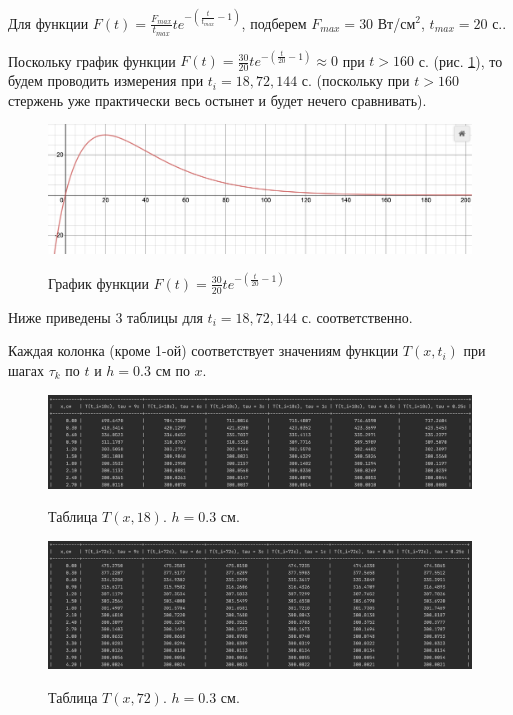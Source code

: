 \documentclass[a4paper,12pt]{article}
\begin{document}
	Для функции $F(t) = \frac{F_{max}}{t_{max}}t e^{-(\frac{t}{t_{max}} - 1)}$, подберем $F_{max} = 30$ Вт/см$^2$, $t_{max} = 20$ с..
	
	Поскольку график функции $F(t) = \frac{30}{20}t e^{-(\frac{t}{20} - 1)} \approx 0$ при $t > 160$ с. (рис. \ref{ris:F(t)}), то будем проводить измерения при $t_i = 18, 72, 144$ с. (поскольку при $t > 160$ стержень уже практически весь остынет и будет нечего сравнивать).
	
	\newpage
	
	\begin{figure}[h!]
		\begin{center}
			{\includegraphics[scale = 0.5]{F(t).png}}
		\end{center}
		\caption{График функции $F(t) = \frac{30}{20}t e^{-(\frac{t}{20} - 1)}$}
		\label{ris:F(t)}
	\end{figure}

	Ниже приведены 3 таблицы для $t_i = 18, 72, 144$ с. соответственно.
	
	Каждая колонка (кроме 1-ой) соответствует значениям функции $T(x, t_i)$ при шагах $\tau_k$ по $t$ и $h = 0.3$ см по $x$.
	
	\begin{figure}[h!]
		\begin{center}
			{\includegraphics[scale = 0.43]{18.png}}
			\label{table:18}
		\end{center}
		\caption{Таблица $T(x, 18)$. $h = 0.3$ см.}
	\end{figure}

	\begin{figure}[h!]
		\begin{center}
			{\includegraphics[scale = 0.43]{72.png}}
			\label{table:72}
		\end{center}
		\caption{Таблица $T(x, 72)$. $h = 0.3$ см.}
	\end{figure}
\end{document}
